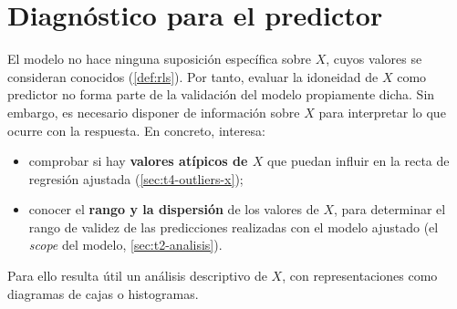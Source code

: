 \section{Diagnóstico para el predictor}
\label{sec:t4-predictor}

El modelo no hace ninguna suposición específica sobre $X$, cuyos valores se consideran
conocidos (\cref{def:rls}). Por tanto, evaluar la idoneidad de $X$ como predictor no forma
parte de la validación del modelo propiamente dicha. Sin embargo, es necesario disponer de
información sobre $X$ para interpretar lo que ocurre con la respuesta. En concreto, interesa:
\begin{itemize}
  \item comprobar si hay \textbf{valores atípicos de $X$} que puedan influir en la recta de
    regresión ajustada (\cref{sec:t4-outliers-x});
  \item conocer el \textbf{rango y la dispersión} de los valores de $X$, para determinar el
    rango de validez de las predicciones realizadas con el modelo ajustado (el \emph{scope} del
    modelo, \cref{sec:t2-analisis}).
\end{itemize}
Para ello resulta útil un análisis descriptivo de $X$, con representaciones como diagramas de
cajas o histogramas.
